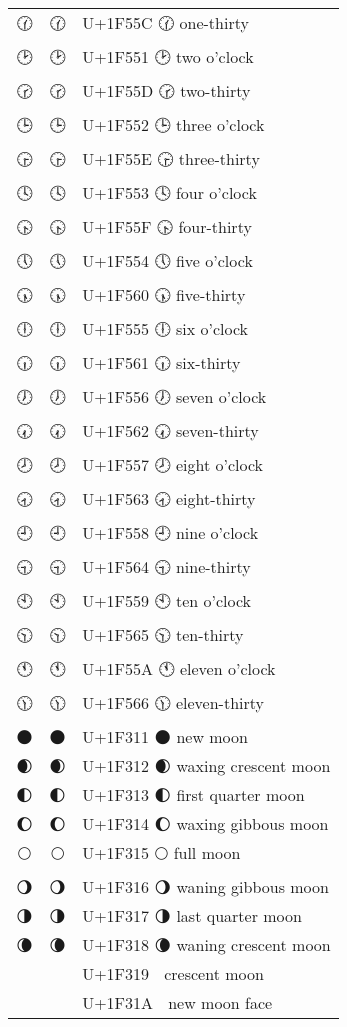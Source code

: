 \documentclass[a4paper,12pt]{article}
\newcommand{\fontA}[1]{{\fontspec[RawFeature={mode=harf,+dist,+ccmp}]{Segoe UI Emoji} #1}}
\newcommand{\fontB}[1]{{\fontspec[RawFeature={mode=harf,+dist,+ccmp}]{Noto Color Emoji} #1}}
\begin{document}
\begin{longtable}[c]{ccp{0.8\linewidth}}
\fontA{🕜}&\fontB{🕜}&U+1F55C 🕜 one-thirty\\
\fontA{🕑}&\fontB{🕑}&U+1F551 🕑 two o’clock\\
\fontA{🕝}&\fontB{🕝}&U+1F55D 🕝 two-thirty\\
\fontA{🕒}&\fontB{🕒}&U+1F552 🕒 three o’clock\\
\fontA{🕞}&\fontB{🕞}&U+1F55E 🕞 three-thirty\\
\fontA{🕓}&\fontB{🕓}&U+1F553 🕓 four o’clock\\
\fontA{🕟}&\fontB{🕟}&U+1F55F 🕟 four-thirty\\
\fontA{🕔}&\fontB{🕔}&U+1F554 🕔 five o’clock\\
\fontA{🕠}&\fontB{🕠}&U+1F560 🕠 five-thirty\\
\fontA{🕕}&\fontB{🕕}&U+1F555 🕕 six o’clock\\
\fontA{🕡}&\fontB{🕡}&U+1F561 🕡 six-thirty\\
\fontA{🕖}&\fontB{🕖}&U+1F556 🕖 seven o’clock\\
\fontA{🕢}&\fontB{🕢}&U+1F562 🕢 seven-thirty\\
\fontA{🕗}&\fontB{🕗}&U+1F557 🕗 eight o’clock\\
\fontA{🕣}&\fontB{🕣}&U+1F563 🕣 eight-thirty\\
\fontA{🕘}&\fontB{🕘}&U+1F558 🕘 nine o’clock\\
\fontA{🕤}&\fontB{🕤}&U+1F564 🕤 nine-thirty\\
\fontA{🕙}&\fontB{🕙}&U+1F559 🕙 ten o’clock\\
\fontA{🕥}&\fontB{🕥}&U+1F565 🕥 ten-thirty\\
\fontA{🕚}&\fontB{🕚}&U+1F55A 🕚 eleven o’clock\\
\fontA{🕦}&\fontB{🕦}&U+1F566 🕦 eleven-thirty\\
\fontA{🌑}&\fontB{🌑}&U+1F311 🌑 new moon\\
\fontA{🌒}&\fontB{🌒}&U+1F312 🌒 waxing crescent moon\\
\fontA{🌓}&\fontB{🌓}&U+1F313 🌓 first quarter moon\\
\fontA{🌔}&\fontB{🌔}&U+1F314 🌔 waxing gibbous moon\\
\fontA{🌕}&\fontB{🌕}&U+1F315 🌕 full moon\\
\fontA{🌖}&\fontB{🌖}&U+1F316 🌖 waning gibbous moon\\
\fontA{🌗}&\fontB{🌗}&U+1F317 🌗 last quarter moon\\
\fontA{🌘}&\fontB{🌘}&U+1F318 🌘 waning crescent moon\\
\fontA{🌙}&\fontB{🌙}&U+1F319 🌙 crescent moon\\
\fontA{🌚}&\fontB{🌚}&U+1F31A 🌚 new moon face\\

\end{longtable}
\end{document}
